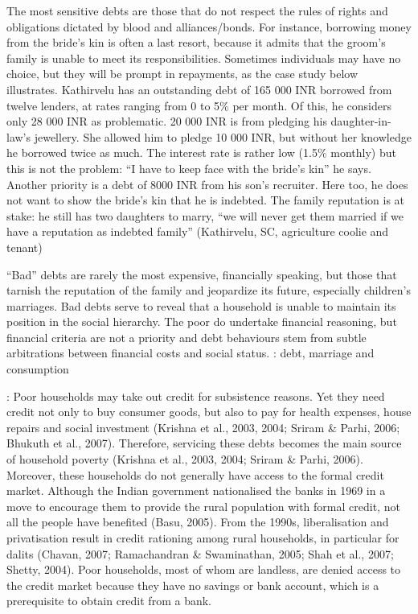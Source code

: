 \documentclass[a4paper, 11pt, onecolumn]{article}
\begin{document}
The most sensitive debts are those that do not respect the rules of rights and
obligations dictated by blood and alliances/bonds. For instance, borrowing money
from the bride’s kin is often a last resort, because it admits that the groom’s family is
unable to meet its responsibilities. Sometimes individuals may have no choice, but they
will be prompt in repayments, as the case study below illustrates.
Kathirvelu has an outstanding debt of 165 000 INR borrowed from twelve lenders, at rates ranging from 0 to
5\% per month. Of this, he considers only 28 000 INR as problematic. 20 000 INR is from pledging his
daughter-in-law’s jewellery. She allowed him to pledge 10 000 INR, but without her knowledge he
borrowed twice as much. The interest rate is rather low (1.5\% monthly) but this is not the problem: “I have
to keep face with the bride’s kin” he says. Another priority is a debt of 8000 INR from his son’s recruiter.
Here too, he does not want to show the bride’s kin that he is indebted. The family reputation is at stake: he
still has two daughters to marry, “we will never get them married if we have a reputation as indebted
family” (Kathirvelu, SC, agriculture coolie and tenant)

“Bad” debts are
rarely the most expensive, financially speaking, but those that tarnish the reputation of the
family and jeopardize its future, especially children’s marriages. Bad debts serve to reveal that a household is unable to maintain its position in the social hierarchy. The poor do
undertake financial reasoning, but financial criteria are not a priority and debt behaviours
stem from subtle arbitrations between financial costs and social status.
\cite{James2020} : debt, marriage and consumption





\cite{Bhukuth2018} : Poor households may take out credit for subsistence reasons. Yet they need credit not
only to buy consumer goods, but also to pay for health expenses, house repairs and social
investment (Krishna et al., 2003, 2004; Sriram \& Parhi, 2006; Bhukuth et al., 2007).
Therefore, servicing these debts becomes the main source of household poverty (Krishna
et al., 2003, 2004; Sriram \& Parhi, 2006).
Moreover, these households do not generally have access to the formal credit market.
Although the Indian government nationalised the banks in 1969 in a move to encourage
them to provide the rural population with formal credit, not all the people have benefited
(Basu, 2005). From the 1990s, liberalisation and privatisation result in credit rationing
among rural households, in particular for dalits (Chavan, 2007; Ramachandran \&
Swaminathan, 2005; Shah et al., 2007; Shetty, 2004). Poor households, most of whom
are landless, are denied access to the credit market because they have no savings or bank
account, which is a prerequisite to obtain credit from a bank.
\end{document}
